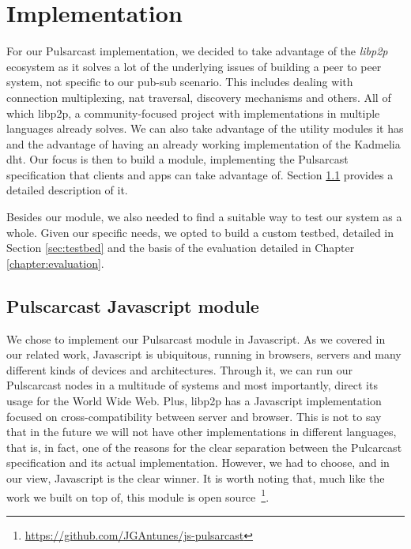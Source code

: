 
\chapter{Implementation}
\label{chapter:implementation}

For our Pulsarcast implementation, we decided to take advantage of the
\emph{libp2p} ecosystem as it solves a lot of the underlying issues of building
a peer to peer system, not specific to our pub-sub scenario. This includes
dealing with connection multiplexing, \acrshort{nat} traversal, discovery
mechanisms and others.  All of which libp2p, a community-focused project with
implementations in multiple languages already solves. We can also take
advantage of the utility modules it has and the advantage of having an already
working implementation of the Kadmelia \acrshort{dht}. Our focus is then to
build a module, implementing the Pulsarcast specification that clients and apps
can take advantage of. Section \ref{pulsarcast-javascript-module} provides a
detailed description of it.

Besides our module, we also needed to find a suitable way to test our system as
a whole. Given our specific needs, we opted to build a custom testbed, detailed
in Section \ref{sec:testbed} and the basis of the evaluation detailed in Chapter
\ref{chapter:evaluation}. 

\section{Pulscarcast Javascript module}\label{pulsarcast-javascript-module}

We chose to implement our Pulsarcast module in Javascript. As we covered in our
related work, Javascript is ubiquitous, running in browsers, servers and many
different kinds of devices and architectures. Through it, we can run our
Pulscarcast nodes in a multitude of systems and most importantly, direct its
usage for the World Wide Web. Plus, libp2p has a Javascript implementation
focused on cross-compatibility between server and browser. This is not to say
that in the future we will not have other implementations in different
languages, that is, in fact, one of the reasons for the clear separation
between the Pulcarcast specification and its actual implementation.  However,
we had to choose, and in our view, Javascript is the clear winner. It is worth
noting that, much like the work we built on top of, this module is open
source~\footnote{\url{https://github.com/JGAntunes/js-pulsarcast}}.

